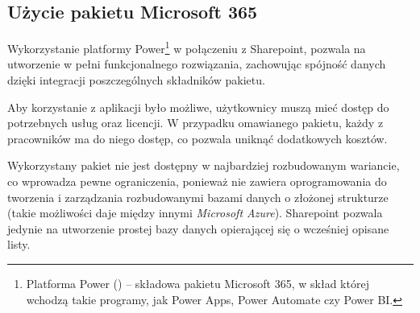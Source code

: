 \subsection{Użycie pakietu Microsoft 365}
\begin{comment}


Wykorzystanie platformy Power\footnote{Platforma Power (\english{Power Platform}) -- Składowa pakietu Microsoft 365. Zawiera ona takie programy jak Power Apps, Power Automate czy Power BI.} w połączeniu z Sharepoint, pozwala na utworzenie w pełni funkcjonalnego rozwiązania, zachowując spójność danych dzięki integracji poszczególnych składników pakietu.

Aby korzystanie z aplikacji było możliwe, użytkownicy muszą mieć dostęp do potrzebnych usług oraz licencje. W przypadku omawianego pakietu, każdy z pracowników, ma do niego dostęp. Pozwala to na uniknięcie dodatkowych kosztów.

Niestety użyty pakiet, nie jest dostępny w najbardziej rozbudowanym wariancie. Wprowadza to pewne ograniczenia, ponieważ brakuje w nim oprogramowania do tworzenia i zarządzania rozbudowanymi bazami danych o złożonej strukturze (takie możliwości daje między innymi \emph{Microsoft Azure}).
Sharepoint pozwala jedynie na utworzenie prostej bazy danych opierającej się o wcześniej opisane listy.  Głównym problemem było ograniczenie związane z brakiem możliwości tworzenia relacji między kilkoma listami, co znacząco utrudniało zarządzanie danymi o złożonej strukturze.

\end{comment}

Wykorzystanie platformy Power\footnote{Platforma Power () -- składowa pakietu Microsoft 365, w skład której wchodzą takie programy, jak Power Apps, Power Automate czy Power BI.} w połączeniu z Sharepoint, pozwala na utworzenie w pełni funkcjonalnego rozwiązania, zachowując spójność danych dzięki integracji poszczególnych składników pakietu.

Aby korzystanie z aplikacji było możliwe, użytkownicy muszą mieć dostęp do potrzebnych usług oraz licencji. W przypadku omawianego pakietu, każdy z pracowników ma do niego dostęp, co pozwala uniknąć dodatkowych kosztów.

Wykorzystany pakiet nie jest dostępny w najbardziej rozbudowanym wariancie, co wprowadza pewne ograniczenia, ponieważ nie zawiera oprogramowania do tworzenia i zarządzania rozbudowanymi bazami danych o złożonej strukturze (takie możliwości daje między innymi \emph{Microsoft Azure}).
Sharepoint pozwala jedynie na utworzenie prostej bazy danych opierającej się o wcześniej opisane listy.


